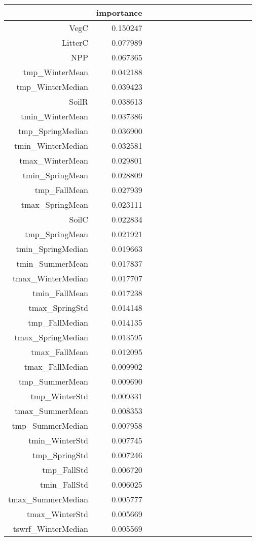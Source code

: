\begin{table}[h]
\centering
\label{table:5}
\begin{tabular}{rrrrrrrrrrrrrrr}
\toprule
 & importance \\
\midrule
VegC & 0.150247 \\
LitterC & 0.077989 \\
NPP & 0.067365 \\
tmp_WinterMean & 0.042188 \\
tmp_WinterMedian & 0.039423 \\
SoilR & 0.038613 \\
tmin_WinterMean & 0.037386 \\
tmp_SpringMedian & 0.036900 \\
tmin_WinterMedian & 0.032581 \\
tmax_WinterMean & 0.029801 \\
tmin_SpringMean & 0.028809 \\
tmp_FallMean & 0.027939 \\
tmax_SpringMean & 0.023111 \\
SoilC & 0.022834 \\
tmp_SpringMean & 0.021921 \\
tmin_SpringMedian & 0.019663 \\
tmin_SummerMean & 0.017837 \\
tmax_WinterMedian & 0.017707 \\
tmin_FallMean & 0.017238 \\
tmax_SpringStd & 0.014148 \\
tmp_FallMedian & 0.014135 \\
tmax_SpringMedian & 0.013595 \\
tmax_FallMean & 0.012095 \\
tmax_FallMedian & 0.009902 \\
tmp_SummerMean & 0.009690 \\
tmp_WinterStd & 0.009331 \\
tmax_SummerMean & 0.008353 \\
tmp_SummerMedian & 0.007958 \\
tmin_WinterStd & 0.007745 \\
tmp_SpringStd & 0.007246 \\
tmp_FallStd & 0.006720 \\
tmin_FallStd & 0.006025 \\
tmax_SummerMedian & 0.005777 \\
tmax_WinterStd & 0.005669 \\
tswrf_WinterMedian & 0.005569 \\

\end{tabular}
\end{table}
